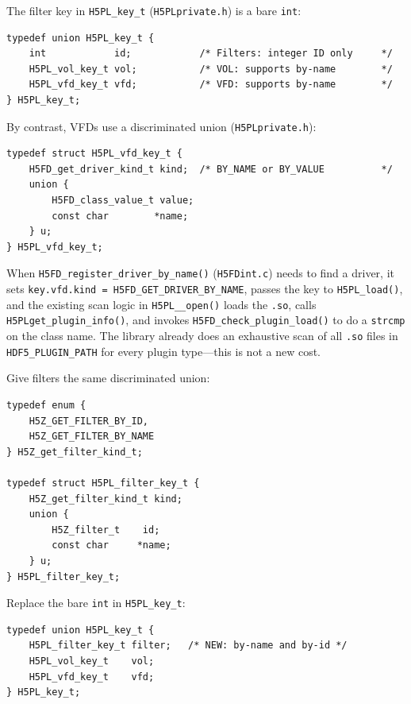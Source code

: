 \documentclass[../HDF5_RFC.tex]{subfiles}
\begin{document}
The filter key in \texttt{H5PL\_key\_t} (\texttt{H5PLprivate.h}) is a bare
\texttt{int}:

\begin{verbatim}
typedef union H5PL_key_t {
    int            id;            /* Filters: integer ID only     */
    H5PL_vol_key_t vol;           /* VOL: supports by-name        */
    H5PL_vfd_key_t vfd;           /* VFD: supports by-name        */
} H5PL_key_t;
\end{verbatim}

By contrast, VFDs use a discriminated union (\texttt{H5PLprivate.h}):

\begin{verbatim}
typedef struct H5PL_vfd_key_t {
    H5FD_get_driver_kind_t kind;  /* BY_NAME or BY_VALUE          */
    union {
        H5FD_class_value_t value;
        const char        *name;
    } u;
} H5PL_vfd_key_t;
\end{verbatim}

When \texttt{H5FD\_register\_driver\_by\_name()} (\texttt{H5FDint.c}) needs to find a driver, it
sets \texttt{key.vfd.kind = H5FD\_GET\_DRIVER\_BY\_NAME}, passes the key to
\texttt{H5PL\_load()}, and the existing scan logic in \texttt{H5PL\_\_open()} loads the \texttt{.so},
calls \texttt{H5PLget\_plugin\_info()}, and invokes \texttt{H5FD\_check\_plugin\_load()} to do a
\texttt{strcmp} on the class name. The library already does an exhaustive scan of all
\texttt{.so} files in \texttt{HDF5\_PLUGIN\_PATH} for every plugin type---this is not a new
cost.

Give filters the same discriminated union:

\begin{verbatim}
typedef enum {
    H5Z_GET_FILTER_BY_ID,
    H5Z_GET_FILTER_BY_NAME
} H5Z_get_filter_kind_t;

typedef struct H5PL_filter_key_t {
    H5Z_get_filter_kind_t kind;
    union {
        H5Z_filter_t    id;
        const char     *name;
    } u;
} H5PL_filter_key_t;
\end{verbatim}

Replace the bare \texttt{int} in \texttt{H5PL\_key\_t}:

\begin{verbatim}
typedef union H5PL_key_t {
    H5PL_filter_key_t filter;   /* NEW: by-name and by-id */
    H5PL_vol_key_t    vol;
    H5PL_vfd_key_t    vfd;
} H5PL_key_t;
\end{verbatim}
\end{document}
